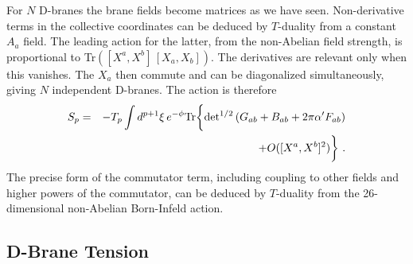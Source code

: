 \documentclass[12pt]{article}
\def\bea{\begin{eqnarray}}
\def\eea{\end{eqnarray}}
\def\ap{\alpha'}
\begin{document}
For $N$ D-branes the brane fields become matrices as we have seen.
Non-derivative terms in the collective coordinates can be deduced by
$T$-duality from a constant $A_a$ field.  The leading action for the
latter, from the non-Abelian field strength, is proportional to
Tr$([X^a, X^b]\,[X_a,X_b])$.  The derivatives are relevant only when this
vanishes.  The $X_a$ then commute and can be diagonalized simultaneously,
giving $N$ independent D-branes.  The action is therefore
\bea
S_p &=& -T_p \int d^{p+1}\xi\, e^{-\phi} {\rm
Tr}\biggl\{ \det\!^{1/2}\left(G_{ab} + B_{ab} + 2\pi\ap F_{ab}\right)
\nonumber\\ 
&&\qquad\qquad\qquad + O([X^a, X^b]^2)
\biggr\}\ .
\label{ndact}
\eea
The precise form of the commutator term, including coupling to other fields
and higher powers of the commutator, can be deduced by $T$-duality from the
26-dimensional non-Abelian Born-Infeld action.

\subsection{D-Brane Tension}
\end{document}
